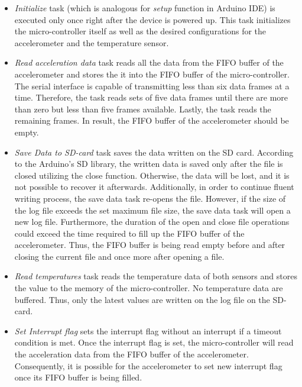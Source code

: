 \documentclass[english,12pt,a4paper,pdftex,elec,utf8]{aaltothesis}
\begin{document}
\begin{itemize}

\item \textit{Initialize} task (which is analogous for \textit{setup} function in Arduino IDE) is executed only once right after the device is powered up. This task initializes the micro-controller itself as well as the desired configurations for the accelerometer and the temperature sensor.

\item \textit{Read acceleration data} task reads all the data from the FIFO buffer of the accelerometer and stores the it into the FIFO buffer of the micro-controller. The serial interface is capable of transmitting less than six data frames at a time. Therefore, the task reads sets of five data frames until there are more than zero but less than five frames available. Lastly, the task reads the remaining frames. In result, the FIFO buffer of the accelerometer should be empty.

\item \textit{Save Data to SD-card} task saves the data written on the SD card. According to the Arduino's SD library, the written data is saved only after the file is closed utilizing the close function. Otherwise, the data will be lost, and it is not possible to recover it afterwards. Additionally, in order to continue fluent writing process, the save data task re-opens the file. However, if the size of the log file exceeds the set maximum file size, the save data task will open a new log file. Furthermore, the duration of the open and close file operations could exceed the time required to fill up the FIFO buffer of the accelerometer. Thus, the FIFO buffer is being read empty before and after closing the current file and once more after opening a file. 

\item \textit{Read temperatures} task reads the temperature data of both sensors and stores the value to the memory of the micro-controller. No temperature data are buffered. Thus, only the latest values are written on the log file on the SD-card.

\item \textit{Set Interrupt flag} sets the interrupt flag without an interrupt if a timeout condition is met. Once the interrupt flag is set, the micro-controller will read the acceleration data from the FIFO buffer of the accelerometer. Consequently, it is possible for the accelerometer to set new interrupt flag once its FIFO buffer is being filled.


\end{itemize}
\end{document}
